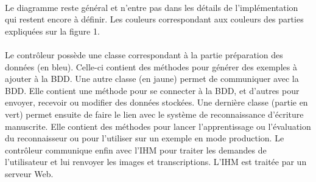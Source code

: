 \paragraph{}

Le diagramme reste général et n’entre pas dans les détails de l’implémentation qui restent encore à définir. Les couleurs correspondant aux couleurs des parties expliquées sur la figure 1.

\paragraph{}

Le contrôleur possède une classe correspondant à la partie préparation des données (en bleu). Celle-ci contient des méthodes pour générer des exemples à ajouter à la BDD. Une autre classe (en jaune) permet de communiquer avec la BDD. Elle contient une méthode pour se connecter à la BDD, et d’autres pour envoyer, recevoir ou modifier des données stockées. Une dernière classe (partie en vert) permet ensuite de faire le lien avec le système de reconnaissance d’écriture manuscrite. Elle contient des méthodes pour lancer l’apprentissage ou l’évaluation du reconnaisseur ou pour l’utiliser sur un exemple en mode production.
Le contrôleur communique enfin avec l’IHM pour traiter les demandes de l’utilisateur et lui renvoyer les images et transcriptions. L’IHM est traitée par un serveur Web.


